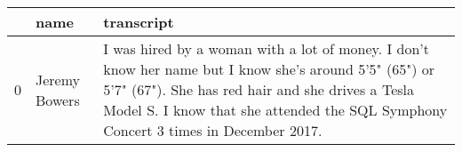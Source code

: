 \begin{tabular}{lll}
\toprule
 & name & transcript \\
\midrule
0 & Jeremy Bowers & I was hired by a woman with a lot of money. I don't know her name but I know she's around 5'5" (65") or 5'7" (67"). She has red hair and she drives a Tesla Model S. I know that she attended the SQL Symphony Concert 3 times in December 2017.
 \\
\bottomrule
\end{tabular}
